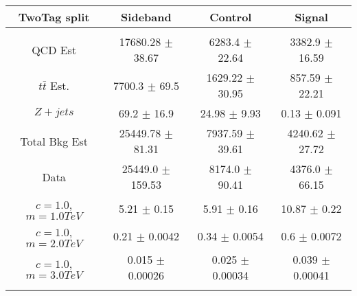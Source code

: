 \begin{footnotesize} 
\begin{tabular}{c|c|c|c} 
TwoTag split & Sideband & Control & Signal \\ 
\hline\hline 
& & & \\ 
QCD Est & 17680.28 $\pm$ 38.67 & 6283.4 $\pm$ 22.64 & 3382.9 $\pm$ 16.59\\ 
$t\bar{t}$ Est.  & 7700.3 $\pm$ 69.5 & 1629.22 $\pm$ 30.95 & 857.59 $\pm$ 22.21\\ 
$Z+jets$ & 69.2 $\pm$ 16.9 & 24.98 $\pm$ 9.93 & 0.13 $\pm$ 0.091\\ 
Total Bkg Est & 25449.78 $\pm$ 81.31 & 7937.59 $\pm$ 39.61 & 4240.62 $\pm$ 27.72\\ 
Data & 25449.0 $\pm$ 159.53 & 8174.0 $\pm$ 90.41 & 4376.0 $\pm$ 66.15\\ 
$c=1.0$,$m=1.0TeV$ & 5.21 $\pm$ 0.15 & 5.91 $\pm$ 0.16 & 10.87 $\pm$ 0.22\\ 
$c=1.0$,$m=2.0TeV$ & 0.21 $\pm$ 0.0042 & 0.34 $\pm$ 0.0054 & 0.6 $\pm$ 0.0072\\ 
$c=1.0$,$m=3.0TeV$ & 0.015 $\pm$ 0.00026 & 0.025 $\pm$ 0.00034 & 0.039 $\pm$ 0.00041\\ 
& & & \\ 
\hline\hline 
\end{tabular} 
\end{footnotesize} 
\newline 
